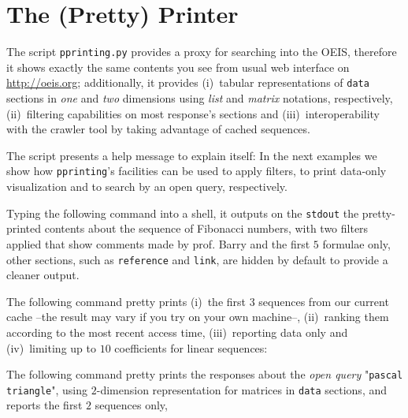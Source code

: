 \iffalse
Finally, the function \verb|oeis| puts all together and it is the main
interface exported by the \verb|crawling| module:
\inputminted[stripnl=false,firstline=195,lastline=221,baselinestretch=0.8]
    {python}{deps/oeis-tools/src/crawling.py}
\fi

\section{The (Pretty) Printer}

The script \verb|pprinting.py| provides a proxy for searching into the OEIS,
therefore it shows exactly the same contents you see from usual web interface
on \url{http://oeis.org}; additionally, it provides (i)~tabular representations
of \verb|data| sections in \textit{one} and \textit{two} dimensions using
\textit{list} and \textit{matrix} notations, respectively, (ii)~filtering
capabilities on most response's sections and (iii)~interoperability with the
crawler tool by taking advantage of cached sequences.

The script presents a help message to explain itself:
 In the next examples
we show how \verb|pprinting|'s facilities can be used to apply filters, to
print data-only visualization and to search by an open query, respectively.

\begin{example} Typing the following command into a shell, it outputs
on the \verb|stdout| the pretty-printed contents about the sequence of
Fibonacci numbers, with two filters applied that show comments made by
prof. Barry and the first $5$ formulae only,
other sections, such as \verb|reference| and \verb|link|, are hidden by
default to provide a cleaner output.
\end{example}

\begin{example}
The following command pretty prints (i)~the first 3 sequences from our current
cache --the result may vary if you try on your own machine--, (ii)~ranking them
according to the most recent access time, (iii)~reporting data only and
(iv)~limiting up to $10$ coefficients for linear sequences:
\end{example}

\begin{example}
The following command pretty prints the responses about the \textit{open query}
"\verb|pascal triangle|", using $2$-dimension representation for matrices
in \verb|data| sections, and reports the first $2$ sequences only,
\end{example}

